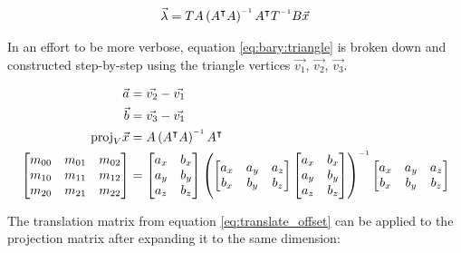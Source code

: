 \begin{align}
    \label{eq:bary:triangle}
    \vec{\lambda} = TA\left(A\transpose A\right)\inverse A\transpose T\inverse B \vec{x}
\end{align}

In  an effort to be more verbose, equation \ref{eq:bary:triangle} is broken down
and   constructed   step-by-step   using  the  triangle  vertices   $\vec{v_1}$,
$\vec{v_2}$, $\vec{v_3}$.

\begin{align*}
    \vec{a} &= \vec{v_2} - \vec{v_1} \\
    \vec{b} &= \vec{v_3} - \vec{v_1} \\
    \text{proj}_V\vec{x} &= A\left(A\transpose A\right)\inverse A\transpose \\
    \begin{bmatrix}
        m_{00} & m_{01} & m_{02} \\
        m_{10} & m_{11} & m_{12} \\
        m_{20} & m_{21} & m_{22} \\
    \end{bmatrix}
    &=  \begin{bmatrix}
            a_x & b_x \\
            a_y & b_y \\
            a_z & b_z \\
        \end{bmatrix}
        \left(
            \begin{bmatrix}
                a_x & a_y & a_z \\
                b_x & b_y & b_z \\
            \end{bmatrix}
            \begin{bmatrix}
                a_x & b_x \\
                a_y & b_y \\
                a_z & b_z \\
            \end{bmatrix}
        \right)\inverse
        \begin{bmatrix}
            a_x & a_y & a_z \\
            b_x & b_y & b_z \\
        \end{bmatrix} \\
\end{align*}

The translation matrix from equation \ref{eq:translate_offset} can be applied to
the projection matrix after expanding it to the same dimension:

